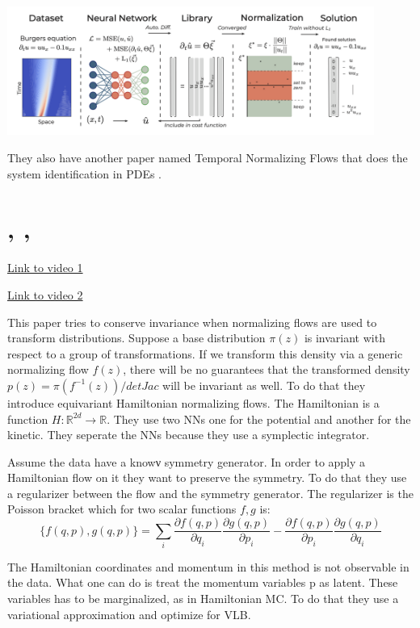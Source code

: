 \documentclass{article}
\newcommand{\citeall}[1]{\citeauthor{#1}, \citetitle{#1}, \citeyear{#1}}
\begin{document}
\includegraphics[width=0.9\textwidth]{images/deepmod.png}

They also have another paper named Temporal Normalizing Flows that does the system identification in PDEs \cite{Both2019TemporalFlows}.

\section{\citeall{Rezende2019EquivariantFlows}}

\href{http://youtube.com/watch?v=8VV0kL7Qg3Y}{Link to video 1}

\href{https://slideslive.com/38922578/equivariant-hamiltonian-flows}{Link to video 2}


This paper tries to conserve invariance when normalizing flows are used to transform distributions. Suppose a base distribution $\pi(z)$ is invariant with respect to a group of transformations. If we transform this density via a generic normalizing flow $f(z)$, there will be no guarantees that the transformed density $p(z)=\pi(f^{−1}(z))/det Jac$ will be invariant as well.
To do that they introduce equivariant Hamiltonian normalizing flows. The Hamiltonian is a function $H: \mathbb{R}^{2 d} \rightarrow \mathbb{R}$. They use two NNs one for the potential and another for the kinetic. They seperate the NNs because they use a symplectic integrator. 

Assume the data have a knowν symmetry generator. In order to apply a Hamiltonian flow on it they want to preserve the symmetry. To do that they use a regularizer between the flow and the symmetry generator. The regularizer is the Poisson bracket which for two scalar functions $f,g$ is:
$$
\{f(q, p), g(q, p)\}=\sum_{i} \frac{\partial f(q, p)}{\partial q_{i}} \frac{\partial g(q, p)}{\partial p_{i}}-\frac{\partial f(q, p)}{\partial p_{i}} \frac{\partial g(q, p)}{\partial q_{i}}
$$

The Hamiltonian coordinates and momentum in this method is not observable in the data. What one can do is treat the momentum variables p as latent. These variables has to be marginalized, as in Hamiltonian MC. To do that they use a variational approximation and optimize for VLB.
\end{document}
